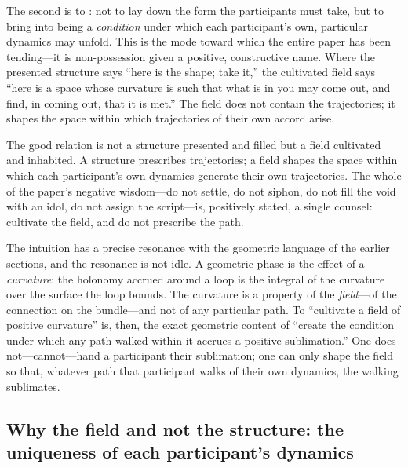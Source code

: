 The second is to : not to lay down the form the participants must take, but to bring into being a \emph{condition} under which each participant's own, particular dynamics may unfold. This is the mode toward which the entire paper has been tending---it is non-possession given a positive, constructive name. Where the presented structure says ``here is the shape; take it,'' the cultivated field says ``here is a space whose curvature is such that what is in you may come out, and find, in coming out, that it is met.'' The field does not contain the trajectories; it shapes the space within which trajectories of their own accord arise.

\begin{claim}
The good relation is not a structure presented and filled but a field cultivated and inhabited. A structure prescribes trajectories; a field shapes the space within which each participant's own dynamics generate their own trajectories. The whole of the paper's negative wisdom---do not settle, do not siphon, do not fill the void with an idol, do not assign the script---is, positively stated, a single counsel: cultivate the field, and do not prescribe the path.
\end{claim}

The intuition has a precise resonance with the geometric language of the earlier sections, and the resonance is not idle. A geometric phase is the effect of a \emph{curvature}: the holonomy accrued around a loop is the integral of the curvature over the surface the loop bounds. The curvature is a property of the \emph{field}---of the connection on the bundle---and not of any particular path. To ``cultivate a field of positive curvature'' is, then, the exact geometric content of ``create the condition under which any path walked within it accrues a positive sublimation.'' One does not---cannot---hand a participant their sublimation; one can only shape the field so that, whatever path that participant walks of their own dynamics, the walking sublimates. 

\subsection{Why the field and not the structure: the uniqueness of each participant's dynamics}
\label{p09:sec:why-field}

